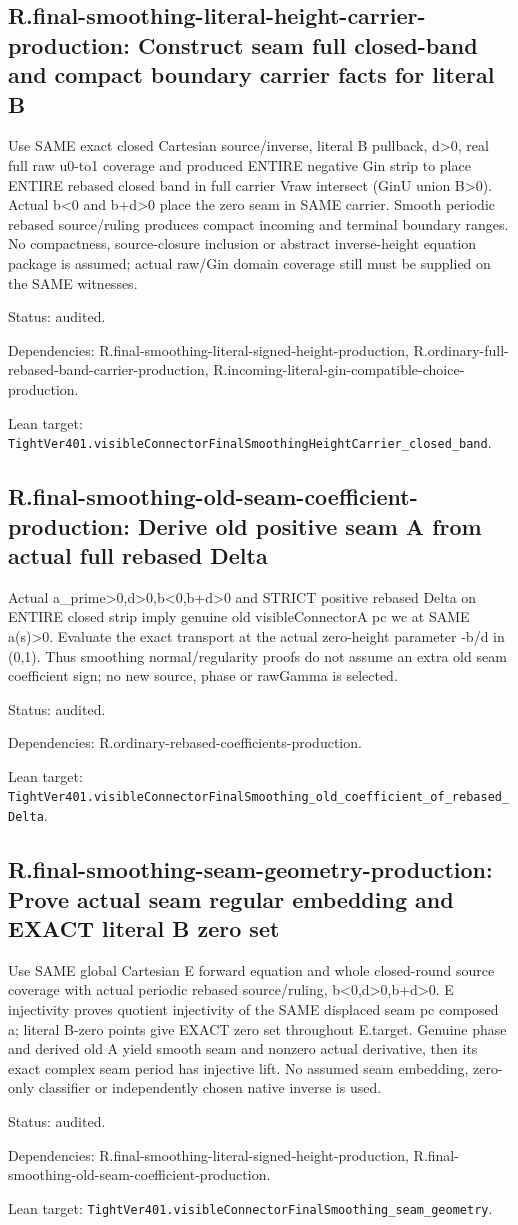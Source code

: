 \documentclass{article}
\begin{document}
\subsection*{R.final-smoothing-literal-height-carrier-production: Construct seam full closed-band and compact boundary carrier facts for literal B}
Use SAME exact closed Cartesian source/inverse, literal B pullback, d>0, real full raw u0-to1 coverage and produced ENTIRE negative Gin strip to place ENTIRE rebased closed band in full carrier Vraw intersect (GinU union B>0). Actual b<0 and b+d>0 place the zero seam in SAME carrier. Smooth periodic rebased source/ruling produces compact incoming and terminal boundary ranges. No compactness, source-closure inclusion or abstract inverse-height equation package is assumed; actual raw/Gin domain coverage still must be supplied on the SAME witnesses.
\par Status: audited.
\par Dependencies: R.final-smoothing-literal-signed-height-production, R.ordinary-full-rebased-band-carrier-production, R.incoming-literal-gin-compatible-choice-production.
\par Lean target: \texttt{TightVer401.visibleConnectorFinalSmoothingHeightCarrier\_closed\_band}.
\subsection*{R.final-smoothing-old-seam-coefficient-production: Derive old positive seam A from actual full rebased Delta}
Actual a\_prime>0,d>0,b<0,b+d>0 and STRICT positive rebased Delta on ENTIRE closed strip imply genuine old visibleConnectorA pc wc at SAME a(s)>0. Evaluate the exact transport at the actual zero-height parameter -b/d in (0,1). Thus smoothing normal/regularity proofs do not assume an extra old seam coefficient sign; no new source, phase or rawGamma is selected.
\par Status: audited.
\par Dependencies: R.ordinary-rebased-coefficients-production.
\par Lean target: \texttt{TightVer401.visibleConnectorFinalSmoothing\_old\_coefficient\_of\_rebased\_Delta}.
\subsection*{R.final-smoothing-seam-geometry-production: Prove actual seam regular embedding and EXACT literal B zero set}
Use SAME global Cartesian E forward equation and whole closed-round source coverage with actual periodic rebased source/ruling, b<0,d>0,b+d>0. E injectivity proves quotient injectivity of the SAME displaced seam pc composed a; literal B-zero points give EXACT zero set throughout E.target. Genuine phase and derived old A yield smooth seam and nonzero actual derivative, then its exact complex seam period has injective lift. No assumed seam embedding, zero-only classifier or independently chosen native inverse is used.
\par Status: audited.
\par Dependencies: R.final-smoothing-literal-signed-height-production, R.final-smoothing-old-seam-coefficient-production.
\par Lean target: \texttt{TightVer401.visibleConnectorFinalSmoothing\_seam\_geometry}.
\end{document}
